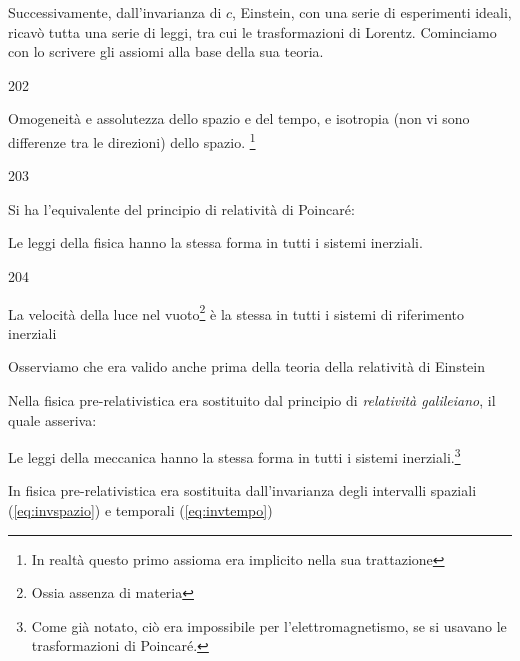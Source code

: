 Successivamente, dall'invarianza di $c$, Einstein, con una serie di
esperimenti ideali, ricav\`o tutta una serie di leggi, tra cui le
trasformazioni di Lorentz. Cominciamo con lo scrivere gli assiomi alla
base della sua teoria.
\begin{dinglist}{202}
\item Omogeneit\`a e assolutezza dello spazio e del tempo, e isotropia
  (non vi sono differenze tra le direzioni) dello spazio. \footnote{In
    realt\`a questo primo assioma era implicito nella sua trattazione}
\end{dinglist}
\begin{dinglist}{203}
\item Si ha l'equivalente del principio di relativit\`a di Poincar\'e:
  \begin{principio} Le leggi della
    fisica hanno la stessa forma in tutti i sistemi inerziali.
  \end{principio}
\end{dinglist}
\begin{dinglist}{204}
\item La velocit\`a della luce nel vuoto\footnote{Ossia assenza di
    materia} \`e la stessa in tutti i sistemi di riferimento inerziali
\end{dinglist}
\begin{osservazione}
  Osserviamo che  era valido anche prima della teoria della
  relativit\`a di Einstein
\end{osservazione}
\begin{osservazione}
  Nella fisica pre-relativistica  era sostituito dal
  principio di \emph{relativit\`a galileiano}, il quale asseriva:
\end{osservazione}
\begin{principio} Le leggi della meccanica hanno la stessa
  forma in tutti i sistemi inerziali.\footnote{Come gi\`a notato,
    ci\`o era impossibile per l'elettromagnetismo, se si usavano le
    trasformazioni di Poincar\'e.}
\end{principio}
\begin{osservazione}
  In fisica pre-relativistica  era sostituita
  dall'invarianza degli intervalli spaziali (\ref{eq:invspazio}) e
  temporali (\ref{eq:invtempo})
\end{osservazione}
